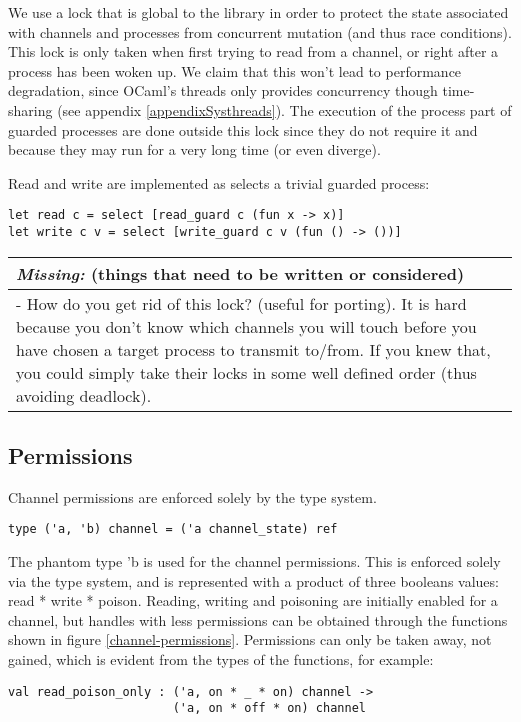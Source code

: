 \documentclass[a4paper,12pt]{article}
\newcommand{\missing}[1]{
  \begin{tabular}{|p{11cm}|}
    \hline
    \emph{Missing:} {\scriptsize (things that need to be written or considered)} \\
    \hline
    #1
    \hline
  \end{tabular}
}
\begin{document}
We use a lock that is global to the library in order to protect the state
associated with channels and processes from concurrent mutation (and
thus race conditions). This lock is only taken when first trying to read from a
channel, or right after a process has been woken up. We claim that this won't
lead to performance degradation, since OCaml's threads only provides concurrency
though time-sharing (see appendix \ref{appendixSysthreads}). The execution of
the process part of guarded processes are done outside this lock since they do
not require it and because they may run for a very long time (or even diverge).

Read and write are implemented as selects a trivial guarded process:
\begin{verbatim}
let read c = select [read_guard c (fun x -> x)]
let write c v = select [write_guard c v (fun () -> ())]
\end{verbatim}

\missing{
- How do you get rid of this lock? (useful for porting). It is hard because you don't know which
channels you will touch before you have chosen a target process to transmit to/from. If you knew
that, you could simply take their locks in some well defined order (thus avoiding deadlock). \\
}

\subsection{Permissions}

Channel permissions are enforced solely by the type system.

\begin{verbatim}
type ('a, 'b) channel = ('a channel_state) ref
\end{verbatim}

The phantom type 'b is used for the channel permissions. This is enforced solely via the type
system, and is represented with a product of three booleans values: read * write * poison.
Reading, writing and poisoning are initially enabled for a channel, but handles with less 
permissions can be obtained through the functions shown in figure \ref{channel-permissions}. 
Permissions can only be taken away, not gained, which is evident from the types of the 
functions, for example: 

\begin{verbatim}
val read_poison_only : ('a, on * _ * on) channel -> 
                       ('a, on * off * on) channel
\end{verbatim}
\end{document}
